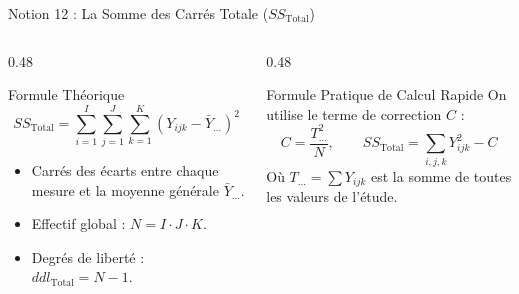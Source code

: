 \documentclass[aspectratio=169,10pt]{beamer}
\begin{document}
\begin{frame}{Notion 12 : La Somme des Carrés Totale ($SS_{\text{Total}}$)}
  \begin{columns}[onlytextwidth, T]
    \begin{column}{0.48\linewidth}
      \begin{conceptbox}{Formule Théorique}
        \small
        \begin{equation*}
          SS_{\text{Total}} = \sum_{i=1}^I \sum_{j=1}^J \sum_{k=1}^K (Y_{ijk} - \bar{Y}_{\dots})^2
        \end{equation*}
        \begin{itemize}
          \item Carrés des écarts entre chaque mesure et la moyenne générale $\bar{Y}_{\dots}$.
          \item Effectif global : $N = I \cdot J \cdot K$.
          \item Degrés de liberté : $ddl_{\text{Total}} = N - 1$.
        \end{itemize}
      \end{conceptbox}
    \end{column}
    \begin{column}{0.48\linewidth}
      \begin{takeawaybox}{Formule Pratique de Calcul Rapide}
        \small
        On utilise le terme de correction $C$ :
        \begin{equation*}
          C = \frac{T_{\dots}^2}{N}, \qquad SS_{\text{Total}} = \sum_{i, j, k} Y_{ijk}^2 - C
        \end{equation*}
        Où $T_{\dots} = \sum Y_{ijk}$ est la somme de toutes les valeurs de l'étude.
      \end{takeawaybox}
    \end{column}
  \end{columns}
\end{frame}
\end{document}
